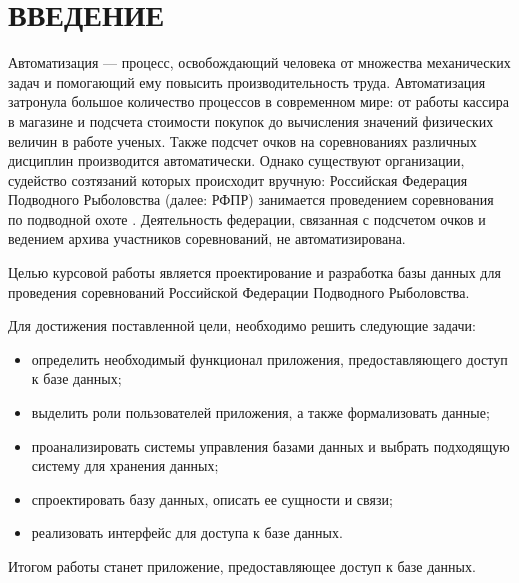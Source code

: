 \section*{ВВЕДЕНИЕ}

Автоматизация --- процесс, освобождающий человека от множества механических задач и помогающий ему повысить производительность труда. Автоматизация затронула большое количество процессов в современном мире: от работы кассира в магазине и подсчета стоимости покупок до вычисления значений физических величин в работе ученых. Также подсчет очков на соревнованиях различных дисциплин производится автоматически. Однако существуют организации, судейство созтязаний которых происходит вручную: Российская Федерация Подводного Рыболовства (далее: РФПР) занимается проведением соревнования по подводной охоте \cite{rfpr}. Деятельность федерации, связанная с подсчетом очков и ведением архива участников соревнований, не автоматизирована.

Целью курсовой работы является проектирование и разработка базы данных для проведения соревнований Российской Федерации Подводного Рыболовства.

Для достижения поставленной цели, необходимо решить следующие задачи:
\begin{itemize}[label=---]
	\item определить необходимый функционал приложения, предоставляющего доступ к базе данных;
	\item выделить  роли пользователей приложения, а также формализовать данные;
	\item проанализировать системы управления базами данных и выбрать подходящую систему для хранения данных;
	\item спроектировать базу данных, описать ее сущности и связи;
	\item реализовать интерфейс для доступа к базе данных.
\end{itemize}

Итогом работы станет приложение, предоставляющее доступ к базе данных.
\pagebreak